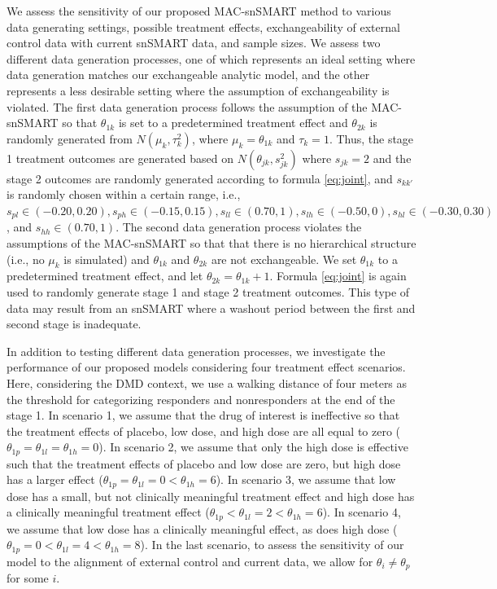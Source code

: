 We assess the sensitivity of our proposed \ac{MAC}-snSMART method to various data generating settings, possible treatment effects, exchangeability of external control data with current \ac{snSMART} data, and sample sizes. We assess two different data generation processes, one of which represents an ideal setting where data generation matches our exchangeable analytic model, and the other represents a less desirable setting where the assumption of exchangeability is violated. The first data generation process follows the assumption of the \ac{MAC}-snSMART so that $\theta_{1k}$ is set to a predetermined treatment effect and $\theta_{2k}$ is randomly generated from $N(\mu_k, \tau_k^2)$, where $\mu_k = \theta_{1k}$ and $\tau_k = 1$. Thus, the stage 1 treatment outcomes are generated based on $N(\theta_{jk}, s_{jk}^2)$ where $s_{jk} = 2$ and the stage 2 outcomes are randomly generated according to formula \ref{eq:joint}, and $s_{kk'}$ is randomly chosen within a certain range, i.e., $s_{pl} \in (-0.20, 0.20), s_{ph} \in (-0.15, 0.15), s_{ll} \in (0.70, 1), s_{lh} \in (-0.50, 0), s_{hl} \in (-0.30, 0.30)$, and $s_{hh} \in (0.70, 1)$. The second data generation process violates the assumptions of the \ac{MAC}-snSMART so that that there is no hierarchical structure (i.e., no $\mu_k$ is simulated) and $\theta_{1k}$ and $\theta_{2k}$ are not exchangeable. We set $\theta_{1k}$ to a predetermined treatment effect, and let $\theta_{2k} = \theta_{1k} + 1$. Formula \ref{eq:joint} is again used to randomly generate stage 1 and stage 2 treatment outcomes. This type of data may result from an \ac{snSMART} where a washout period between the first and second stage is inadequate. 

In addition to testing different data generation processes, we investigate the performance of our proposed models considering four treatment effect scenarios. Here, considering the \ac{DMD} context, we use a walking distance of four meters as the threshold for categorizing responders and nonresponders at the end of the stage 1. In scenario 1, we assume that the drug of interest is ineffective so that the treatment effects of placebo, low dose, and high dose are all equal to zero ($\theta_{1p} = \theta_{1l} = \theta_{1h} = 0$). In scenario 2, we assume that only the high dose is effective such that the treatment effects of placebo and low dose are zero, but high dose has a larger effect ($\theta_{1p} = \theta_{1l} = 0 < \theta_{1h} = 6$). In scenario 3, we assume that low dose has a small, but not clinically meaningful treatment effect and high dose has a clinically meaningful treatment effect ($\theta_{1p} < \theta_{1l} = 2 < \theta_{1h} = 6$). In scenario 4, we assume that low dose has a clinically meaningful effect, as does high dose ($\theta_{1p} = 0 < \theta_{1l} = 4 < \theta_{1h} = 8$). In the last scenario, to assess the sensitivity of our model to the alignment of external control and current data, we allow for $\theta_i \ne \theta_p$ for some $i$. 

